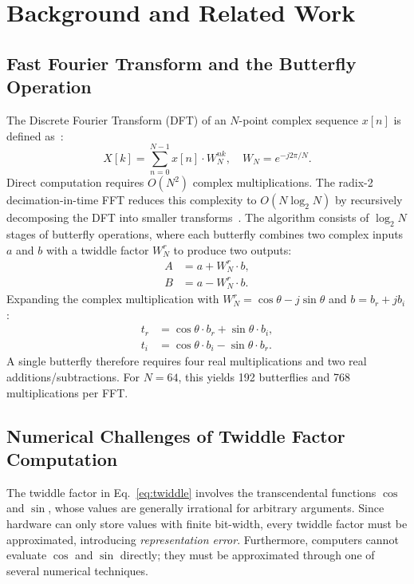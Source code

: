 \documentclass[conference]{IEEEtran}
\begin{document}
\section{Background and Related Work}
\label{sec:background}

\subsection{Fast Fourier Transform and the Butterfly Operation}

The Discrete Fourier Transform (DFT) of an $N$-point complex sequence $x[n]$ is
defined as~\cite{oppenheim2010}:
\begin{equation}
X[k] = \sum_{n=0}^{N-1} x[n] \cdot W_N^{nk}, \quad W_N = e^{-j 2\pi/N}.
\label{eq:dft}
\end{equation}
Direct computation requires $O(N^2)$ complex multiplications. The radix-2
decimation-in-time FFT reduces this complexity to $O(N \log_2 N)$ by recursively
decomposing the DFT into smaller transforms~\cite{cooley1965,oppenheim2010}. The
algorithm consists of $\log_2 N$ stages of butterfly operations, where each
butterfly combines two complex inputs $a$ and $b$ with a twiddle factor $W_N^r$
to produce two outputs:
\begin{align}
A &= a + W_N^r \cdot b, \label{eq:butterflyA}\\
B &= a - W_N^r \cdot b. \label{eq:butterflyB}
\end{align}
Expanding the complex multiplication with $W_N^r = \cos\theta - j\sin\theta$
and $b = b_r + jb_i$:
\begin{align}
t_r &= \cos\theta \cdot b_r + \sin\theta \cdot b_i, \\
t_i &= \cos\theta \cdot b_i - \sin\theta \cdot b_r.
\end{align}
A single butterfly therefore requires four real multiplications and two real
additions/subtractions. For $N = 64$, this yields 192 butterflies and 768
multiplications per FFT.

\subsection{Numerical Challenges of Twiddle Factor Computation}

The twiddle factor in Eq.~\eqref{eq:twiddle} involves the transcendental
functions $\cos$ and $\sin$, whose values are generally irrational for arbitrary
arguments. Since hardware can only store values with finite bit-width, every
twiddle factor must be approximated, introducing \textit{representation error}.
Furthermore, computers cannot evaluate $\cos$ and $\sin$ directly; they must be
approximated through one of several numerical techniques.
\end{document}
